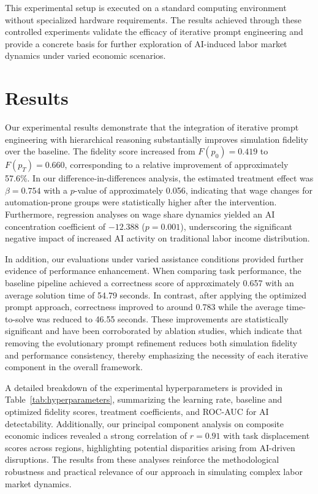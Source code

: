 \documentclass{article}
\begin{document}
This experimental setup is executed on a standard computing environment without specialized hardware requirements. The results achieved through these controlled experiments validate the efficacy of iterative prompt engineering and provide a concrete basis for further exploration of AI-induced labor market dynamics under varied economic scenarios.

\section{Results}
Our experimental results demonstrate that the integration of iterative prompt engineering with hierarchical reasoning substantially improves simulation fidelity over the baseline. The fidelity score increased from \( F(p_0) = 0.419 \) to \( F(p_T) = 0.660 \), corresponding to a relative improvement of approximately 57.6\%. In our difference-in-differences analysis, the estimated treatment effect was \( \beta = 0.754 \) with a \( p \)-value of approximately 0.056, indicating that wage changes for automation-prone groups were statistically higher after the intervention. Furthermore, regression analyses on wage share dynamics yielded an AI concentration coefficient of \(-12.388\) (\(p = 0.001\)), underscoring the significant negative impact of increased AI activity on traditional labor income distribution.

In addition, our evaluations under varied assistance conditions provided further evidence of performance enhancement. When comparing task performance, the baseline pipeline achieved a correctness score of approximately 0.657 with an average solution time of 54.79 seconds. In contrast, after applying the optimized prompt approach, correctness improved to around 0.783 while the average time-to-solve was reduced to 46.55 seconds. These improvements are statistically significant and have been corroborated by ablation studies, which indicate that removing the evolutionary prompt refinement reduces both simulation fidelity and performance consistency, thereby emphasizing the necessity of each iterative component in the overall framework.

A detailed breakdown of the experimental hyperparameters is provided in Table~\ref{tab:hyperparameters}, summarizing the learning rate, baseline and optimized fidelity scores, treatment coefficients, and ROC-AUC for AI detectability. Additionally, our principal component analysis on composite economic indices revealed a strong correlation of \( r = 0.91 \) with task displacement scores across regions, highlighting potential disparities arising from AI-driven disruptions. The results from these analyses reinforce the methodological robustness and practical relevance of our approach in simulating complex labor market dynamics.
\end{document}

